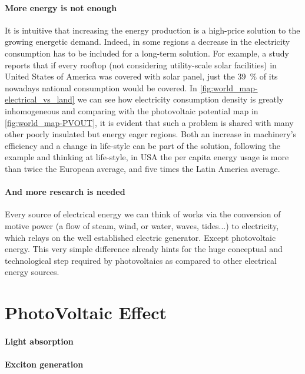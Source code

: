 	\paragraph{More energy is not enough} It is intuitive that increasing the energy production is a high-price solution to the growing energetic demand.
	Indeed, in some regions a decrease in the electricity consumption has to be included for a long-term solution.
	For example, a study\cite{Margolis2016} reports that if every rooftop (not considering utility-scale solar facilities) in United States of America was covered with solar panel, just the 39~\% of its nowadays national consumption would be covered.
	In \cref{fig:world_map-electrical_vs_land} we can see how electricity consumption density is greatly inhomogeneous and comparing with the photovoltaic potential map in \cref{fig:world_map-PVOUT}, it is evident that such a problem is shared with many other poorly insulated but energy eager regions.
	Both an increase in machinery's efficiency and a change in life-style can be part of the solution, following the example and thinking at life-style, in USA the per capita energy usage is more than twice the European average, and five times the Latin America average.\cite{IEA}

	\paragraph{And more research is needed} Every source of electrical energy we can think of works via the conversion of motive power (a flow of steam, wind, or water, waves, tides...) to electricity, which relays on the well established electric generator. Except photovoltaic energy. This very simple difference already hints for the huge conceptual and technological step required by photovoltaics as compared to other electrical energy sources.
	

\section{PhotoVoltaic Effect}

	\paragraph{Light absorption}

	\paragraph{Exciton generation}

